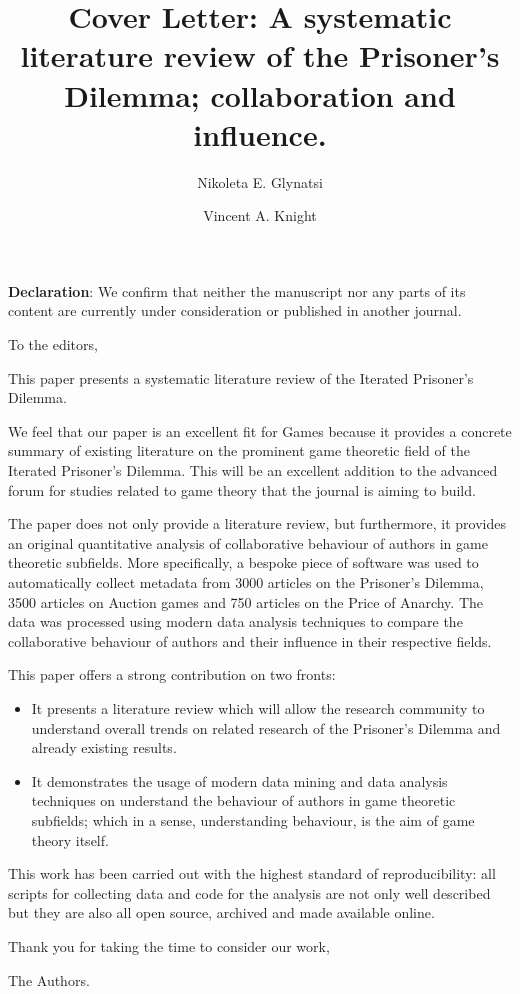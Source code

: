 \documentclass{article}
\title{Cover Letter: A systematic literature review of the Prisoner's Dilemma; collaboration and influence.}
\author[1]{Nikoleta E. Glynatsi}
\author[1]{Vincent A. Knight}
\affil[1]{Cardiff University, School of Mathematics, Cardiff, United Kingdom}
\date{}
\begin{document}
\maketitle
\bigskip
\textbf{Declaration}: We confirm that neither the manuscript nor any parts of its
content are currently under consideration or published in another journal.

To the editors,

This paper presents a systematic literature review of the Iterated Prisoner's
Dilemma.

We feel that our paper is an excellent fit for Games because it provides a
concrete summary of existing literature on the prominent game theoretic field of
the Iterated Prisoner's Dilemma. This will be an excellent addition to the
advanced forum for studies related to game theory that the journal is aiming to
build.

The paper does not only provide a literature review, but furthermore, it
provides an original quantitative analysis of collaborative behaviour of authors
in game theoretic subfields. More specifically, a bespoke piece of software
was used to automatically collect metadata from 3000 articles on the Prisoner's Dilemma, 3500
articles on Auction games and 750 articles on the Price of Anarchy. The data was
processed using modern data analysis techniques to compare the collaborative
behaviour of authors and their influence in their respective fields.

This paper offers a strong contribution on two fronts:

\begin{itemize}
    \item It presents a literature review which will allow the research
    community to understand overall trends on related research of the Prisoner's
    Dilemma and already existing results.
    \item It demonstrates the usage of modern data mining and data analysis
    techniques on understand the behaviour of authors in game theoretic
    subfields; which in a sense, understanding behaviour, is the aim of game
    theory itself.
\end{itemize}

This work has been carried out with the highest standard of reproducibility: all
scripts for collecting data and code for the analysis are not only well described but they
are also all open source, archived and made available online.


Thank you for taking the time to consider our work,

The Authors.
\end{document}
